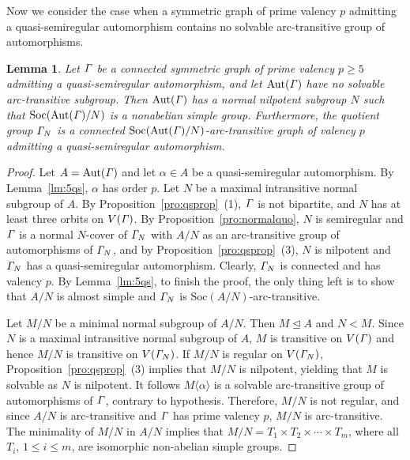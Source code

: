 \documentclass[12pt,reqno]{amsart}
\renewcommand\a{\alpha}  \renewcommand\b{\beta}
\def\soc{ \mathrm{Soc}}
\numberwithin {equation} {section}
\newtheorem{lemma}[theorem]{Lemma}
\begin{document}
Now we consider the case when a symmetric graph of prime valency $p$ admitting a quasi-semiregular automorphism contains no solvable arc-transitive group of automorphisms.

\begin{lemma}\label{lm:valp2}
Let ${\it \Gamma}$ be a connected symmetric graph of prime valency $p\geq 5$ admitting a quasi-semiregular automorphism, and let $\mathrm{Aut}({\it \Gamma})$ have no solvable arc-transitive subgroup.
Then $\mathrm{Aut}({\it \Gamma})$ has a normal nilpotent subgroup $N$ such that $\soc(\Aut(\Ga)/N)$ is a  nonabelian simple group. Furthermore, the quotient group ${\it \Gamma}_N$ is a connected $\soc(\Aut(\Ga)/N)$-arc-transitive graph of valency $p$ admitting a quasi-semiregular automorphism.
 \end{lemma}

\begin{proof}
Let $A=\mathrm{Aut}({\it \Gamma})$ and let $\a\in A$ be a quasi-semiregular automorphism. By Lemma~\ref{lm:5qs}, $\a$ has order $p$. Let $N$ be a maximal intransitive normal subgroup of $A$. By Proposition~\ref{pro:qsprop}~(1), ${\it \Gamma}$ is not bipartite, and $N$ has at least three orbits on $V({\it \Gamma})$. By Proposition~\ref{pro:normalquo}, $N$ is semiregular and ${\it \Gamma}$ is a normal $N$-cover of ${\it \Gamma}_N$ with $A/N$ as an arc-transitive group of automorphisms of ${\it \Gamma}_N$, and by Proposition~\ref{pro:qsprop}~(3), $N$ is nilpotent and ${\it \Gamma}_N$ has a quasi-semiregular automorphism. Clearly, ${\it \Gamma}_N$ is connected and has valency $p$. By Lemma~\ref{lm:5qs}, to finish the proof, the only thing left is to show that $A/N$ is almost simple and ${\it \Gamma}_N$ is $\soc(A/N)$-arc-transitive.

Let $M/N$ be a minimal normal subgroup of $A/N$. Then $M\unlhd A$ and $N<M$. Since $N$ is a maximal intransitive normal subgroup of $A$, $M$ is transitive on $V({\it \Gamma})$ and hence $M/N$ is transitive on $V({\it \Gamma}_N)$. If $M/N$ is regular on $V({\it \Gamma}_N)$, Proposition~\ref{pro:qsprop}~(3) implies that $M/N$ is nilpotent,  yielding that $M$ is solvable as $N$ is nilpotent. It follows $M\langle \a\rangle$ is a solvable arc-transitive group of automorphisms of ${\it \Gamma}$, contrary to hypothesis. Therefore, $M/N$ is not regular, and since $A/N$ is arc-transitive and ${\it \Gamma}$ has prime valency $p$, $M/N$ is arc-transitive. The minimality of $M/N$ in $A/N$ implies that $M/N=T_1\times T_2\times\cdots\times T_m$, where all $T_i$, $1\leq i\leq m$, are isomorphic non-abelian simple groups.


\end{proof}
\end{document}
